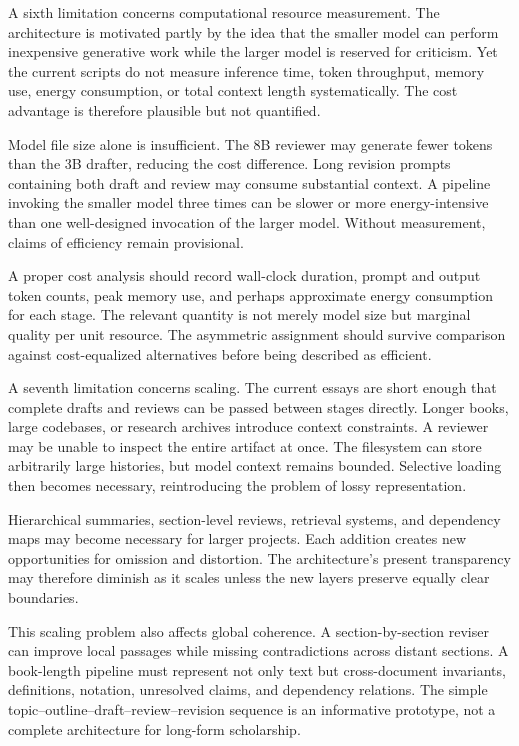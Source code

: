 \documentclass[11pt]{article}
\begin{document}
A sixth limitation concerns computational resource measurement. The architecture is motivated partly by the idea that the smaller model can perform inexpensive generative work while the larger model is reserved for criticism. Yet the current scripts do not measure inference time, token throughput, memory use, energy consumption, or total context length systematically. The cost advantage is therefore plausible but not quantified.

Model file size alone is insufficient. The 8B reviewer may generate fewer tokens than the 3B drafter, reducing the cost difference. Long revision prompts containing both draft and review may consume substantial context. A pipeline invoking the smaller model three times can be slower or more energy-intensive than one well-designed invocation of the larger model. Without measurement, claims of efficiency remain provisional.

A proper cost analysis should record wall-clock duration, prompt and output token counts, peak memory use, and perhaps approximate energy consumption for each stage. The relevant quantity is not merely model size but marginal quality per unit resource. The asymmetric assignment should survive comparison against cost-equalized alternatives before being described as efficient.

A seventh limitation concerns scaling. The current essays are short enough that complete drafts and reviews can be passed between stages directly. Longer books, large codebases, or research archives introduce context constraints. A reviewer may be unable to inspect the entire artifact at once. The filesystem can store arbitrarily large histories, but model context remains bounded. Selective loading then becomes necessary, reintroducing the problem of lossy representation.

Hierarchical summaries, section-level reviews, retrieval systems, and dependency maps may become necessary for larger projects. Each addition creates new opportunities for omission and distortion. The architecture's present transparency may therefore diminish as it scales unless the new layers preserve equally clear boundaries.

This scaling problem also affects global coherence. A section-by-section reviser can improve local passages while missing contradictions across distant sections. A book-length pipeline must represent not only text but cross-document invariants, definitions, notation, unresolved claims, and dependency relations. The simple topic--outline--draft--review--revision sequence is an informative prototype, not a complete architecture for long-form scholarship.
\end{document}
